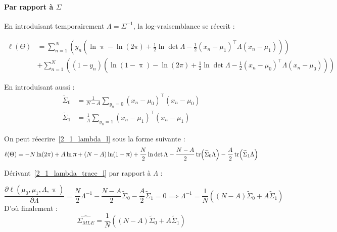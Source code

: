 \documentclass[12pt,a4paper,onecolumn]{article}
\begin{document}
\paragraph*{Par rapport à \protect\( \Sigma\)}
En introduisant temporairement \( \Lambda = \Sigma^{-1}\), la log-vraisemblance se réecrit :

\begin{equation}
	\begin{split}
		\ell(\Theta) & =  \sum_{n = 1}^N
		\left(y_n \left(\ln
			\uppi - \ln(2\pi) + \frac{1}{2}\ln\det\Lambda -\frac{1}{2}(x_n - \mu_1)^\intercal\Lambda(x_n - \mu_1) \right)\right)\\
		&+ 	\sum_{n = 1}^N\left((1 - y_n)
		\left(\ln(1 - \uppi) - \ln(2\pi) + \frac{1}{2}\ln\det\Lambda -\frac{1}{2}(x_n - \mu_0)^\intercal\Lambda(x_n - \mu_0) \right)\right)
	\end{split}
	\label{2_1_lambda_l}
\end{equation}

En introduisant aussi :
\begin{equation}
	\begin{split}
		\widetilde \Sigma_0 &= \frac{1}{N - A}\sum_{y_n = 0} (x_n - \mu_0)^\intercal(x_n - \mu_0) \\
		\widetilde \Sigma_1 &= \frac{1}{A}\sum_{y_n = 1} (x_n - \mu_1)^\intercal(x_n - \mu_1)
	\end{split}
\end{equation}

On peut réecrire~\eqref{2_1_lambda_l} sous la forme suivante :
\begin{equation}
	\begin{split}
		\ell(\Theta) & = -N\ln(2\pi) + A\ln\uppi + (N - A)\ln(1 - \uppi) + \frac{N}{2}\ln\det\Lambda - \frac{N - A}{2}\tr(\widetilde \Sigma_0 \Lambda) -\frac{A}{2}\tr(\widetilde \Sigma_1 \Lambda)\\
		\label{2_1_lambda_trace_l}
	\end{split}
\end{equation}

Dérivant~\eqref{2_1_lambda_trace_l} par rapport à \( \Lambda\) :

\[
	\frac{\partial \ell(\mu_0, \mu_1, \Lambda, \uppi)}{\partial \Lambda} = \frac{N}{2}\Lambda^{-1} - \frac{N - A}{2}\widetilde \Sigma_0 - \frac{A}{2}\widetilde \Sigma_1= 0
	\implies \Lambda^{-1} = \frac{1}{N}\left((N - A)\widetilde \Sigma_0 + A\widetilde \Sigma_1\right)
\]
D'où finalement :
\begin{equation}
	\widehat{\Sigma_{MLE}} = \frac{1}{N}\left((N - A)\widetilde \Sigma_0 + A\widetilde \Sigma_1\right)
\end{equation}
\end{document}
